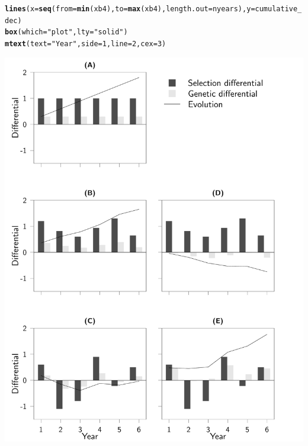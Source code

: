 \documentclass{article}\usepackage[]{graphicx}\usepackage[]{color}
\makeatletter
\def\maxwidth{ %
  \ifdim\Gin@nat@width>\linewidth
    \linewidth
  \else
    \Gin@nat@width
  \fi
}
\newcommand{\hlnum}[1]{\textcolor[rgb]{0.686,0.059,0.569}{#1}}%
\newcommand{\hlstr}[1]{\textcolor[rgb]{0.192,0.494,0.8}{#1}}%
\newcommand{\hlstd}[1]{\textcolor[rgb]{0.345,0.345,0.345}{#1}}%
\newcommand{\hlkwc}[1]{\textcolor[rgb]{0.333,0.667,0.333}{#1}}%
\newcommand{\hlkwd}[1]{\textcolor[rgb]{0.737,0.353,0.396}{\textbf{#1}}}%
\newenvironment{kframe}{%
 \def\at@end@of@kframe{}%
 \ifinner\ifhmode%
  \def\at@end@of@kframe{\end{minipage}}%
  \begin{minipage}{\columnwidth}%
 \fi\fi%
 \def\FrameCommand##1{\hskip\@totalleftmargin \hskip-\fboxsep
 \colorbox{shadecolor}{##1}\hskip-\fboxsep
     \hskip-\linewidth \hskip-\@totalleftmargin \hskip\columnwidth}%
 \MakeFramed {\advance\hsize-\width
   \@totalleftmargin\z@ \linewidth\hsize
   \@setminipage}}%
 {\par\unskip\endMakeFramed%
 \at@end@of@kframe}
\newenvironment{knitrout}{}{} %
\makeatother
\begin{document}
\begin{knitrout}
\begin{kframe}
\begin{alltt}
\hlkwd{lines}\hlstd{(}\hlkwc{x}\hlstd{=}\hlkwd{seq}\hlstd{(}\hlkwc{from}\hlstd{=}\hlkwd{min}\hlstd{(xb4),} \hlkwc{to}\hlstd{=}\hlkwd{max}\hlstd{(xb4),} \hlkwc{length.out} \hlstd{= nyears),} \hlkwc{y}\hlstd{=cumulative_dec)}
\hlkwd{box}\hlstd{(}\hlkwc{which} \hlstd{=} \hlstr{"plot"}\hlstd{,} \hlkwc{lty} \hlstd{=} \hlstr{"solid"}\hlstd{)}
\hlkwd{mtext}\hlstd{(}\hlkwc{text} \hlstd{=} \hlstr{"Year"}\hlstd{,} \hlkwc{side} \hlstd{=} \hlnum{1}\hlstd{,} \hlkwc{line} \hlstd{=} \hlnum{2}\hlstd{,}\hlkwc{cex} \hlstd{=} \hlnum{3}\hlstd{)}
\end{alltt}
\end{kframe}
\includegraphics[width=\maxwidth]{figure/concetpualplot-1} 

\end{knitrout}
\end{document}
